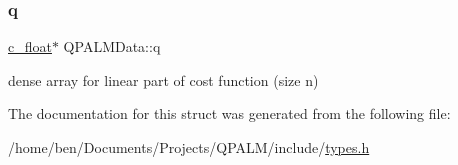 \mbox{\label{structQPALMData_aa6775bd0b50250223ddd66115da68a12}} 
\subsubsection{\texorpdfstring{q}{q}}
{\footnotesize\ttfamily \mbox{\hyperlink{global__opts_8h_a7f1a9fda95e52979658c20a0d134fb15}{c\+\_\+float}}$\ast$ Q\+P\+A\+L\+M\+Data\+::q}



dense array for linear part of cost function (size n) 



The documentation for this struct was generated from the following file\+:\begin{DoxyCompactItemize}
\item 
/home/ben/\+Documents/\+Projects/\+Q\+P\+A\+L\+M/include/\mbox{\hyperlink{types_8h}{types.\+h}}\end{DoxyCompactItemize}
